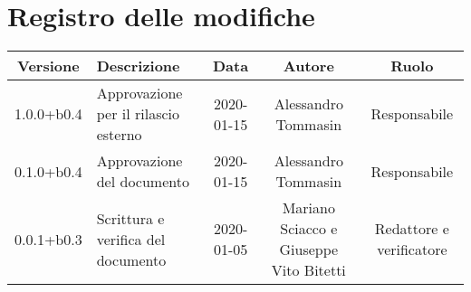 \section*{Registro delle modifiche}

\begin{center}
	\begin{longtable}{|c|p{3cm}|c|c|c|}
	\hline
	\rowcolor{lighter-grayer}
	\textbf{Versione} & \textbf{Descrizione} & \textbf{Data} & \textbf{Autore} & \textbf{Ruolo} \\
	\hline
	\endfirsthead


	1.0.0+b0.4 & Approvazione per il rilascio esterno & 2020-01-15 & Alessandro Tommasin & Responsabile \\
	\hline
	0.1.0+b0.4 & Approvazione del documento & 2020-01-15 & Alessandro Tommasin & Responsabile \\
	\hline
	0.0.1+b0.3 & Scrittura e verifica del documento & 2020-01-05 & Mariano Sciacco e Giuseppe Vito Bitetti & Redattore e verificatore \\
	\hline

	\end{longtable}
\end{center}